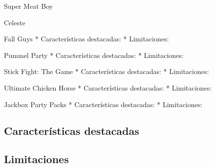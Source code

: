 
Super Meat Boy

Celeste

Fall Guys
    * Características destacadas:
    * Limitaciones:

Pummel Party
    * Características destacadas:
    * Limitaciones:

Stick Fight: The Game
    * Características destacadas:
    * Limitaciones:

Ultimate Chicken Horse
    * Características destacadas:
    * Limitaciones:

Jackbox Party Packs
    * Características destacadas:
    * Limitaciones:

\subsection{Características destacadas}

\subsection{Limitaciones}

